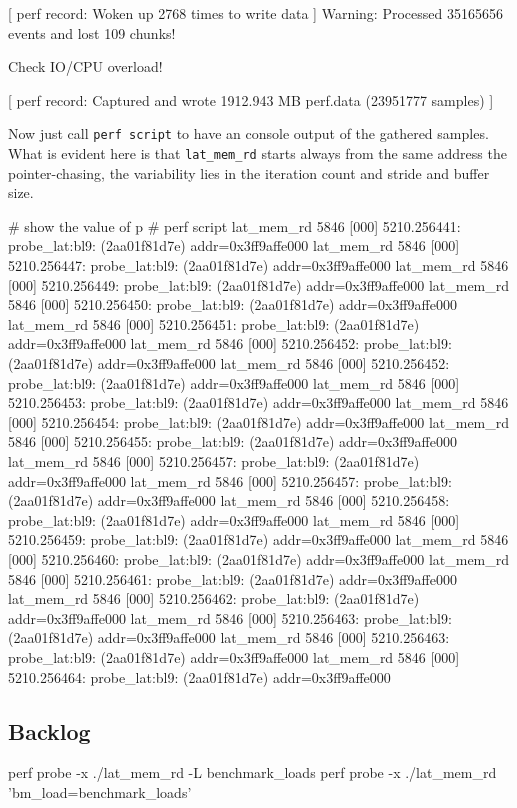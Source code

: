 [ perf record: Woken up 2768 times to write data ]
Warning:
Processed 35165656 events and lost 109 chunks!

Check IO/CPU overload!

[ perf record: Captured and wrote 1912.943 MB perf.data (23951777 samples) ]
\stoptyping

Now just call {\tt perf script} to have an console output of the gathered
samples. What is evident here is that {\tt lat_mem_rd} starts always from
the same address the pointer-chasing, the variability lies in the
iteration count and stride and buffer size.


\starttyping
# show the value of p
# perf script
      lat_mem_rd  5846 [000]  5210.256441: probe_lat:bl9: (2aa01f81d7e) addr=0x3ff9affe000
      lat_mem_rd  5846 [000]  5210.256447: probe_lat:bl9: (2aa01f81d7e) addr=0x3ff9affe000
      lat_mem_rd  5846 [000]  5210.256449: probe_lat:bl9: (2aa01f81d7e) addr=0x3ff9affe000
      lat_mem_rd  5846 [000]  5210.256450: probe_lat:bl9: (2aa01f81d7e) addr=0x3ff9affe000
      lat_mem_rd  5846 [000]  5210.256451: probe_lat:bl9: (2aa01f81d7e) addr=0x3ff9affe000
      lat_mem_rd  5846 [000]  5210.256452: probe_lat:bl9: (2aa01f81d7e) addr=0x3ff9affe000
      lat_mem_rd  5846 [000]  5210.256452: probe_lat:bl9: (2aa01f81d7e) addr=0x3ff9affe000
      lat_mem_rd  5846 [000]  5210.256453: probe_lat:bl9: (2aa01f81d7e) addr=0x3ff9affe000
      lat_mem_rd  5846 [000]  5210.256454: probe_lat:bl9: (2aa01f81d7e) addr=0x3ff9affe000
      lat_mem_rd  5846 [000]  5210.256455: probe_lat:bl9: (2aa01f81d7e) addr=0x3ff9affe000
      lat_mem_rd  5846 [000]  5210.256457: probe_lat:bl9: (2aa01f81d7e) addr=0x3ff9affe000
      lat_mem_rd  5846 [000]  5210.256457: probe_lat:bl9: (2aa01f81d7e) addr=0x3ff9affe000
      lat_mem_rd  5846 [000]  5210.256458: probe_lat:bl9: (2aa01f81d7e) addr=0x3ff9affe000
      lat_mem_rd  5846 [000]  5210.256459: probe_lat:bl9: (2aa01f81d7e) addr=0x3ff9affe000
      lat_mem_rd  5846 [000]  5210.256460: probe_lat:bl9: (2aa01f81d7e) addr=0x3ff9affe000
      lat_mem_rd  5846 [000]  5210.256461: probe_lat:bl9: (2aa01f81d7e) addr=0x3ff9affe000
      lat_mem_rd  5846 [000]  5210.256462: probe_lat:bl9: (2aa01f81d7e) addr=0x3ff9affe000
      lat_mem_rd  5846 [000]  5210.256463: probe_lat:bl9: (2aa01f81d7e) addr=0x3ff9affe000
      lat_mem_rd  5846 [000]  5210.256463: probe_lat:bl9: (2aa01f81d7e) addr=0x3ff9affe000
      lat_mem_rd  5846 [000]  5210.256464: probe_lat:bl9: (2aa01f81d7e) addr=0x3ff9affe000
\stoptyping


\subsection{Backlog}
\starttyping
 perf probe -x ./lat_mem_rd -L benchmark_loads
 perf probe -x ./lat_mem_rd 'bm_load=benchmark_loads'

